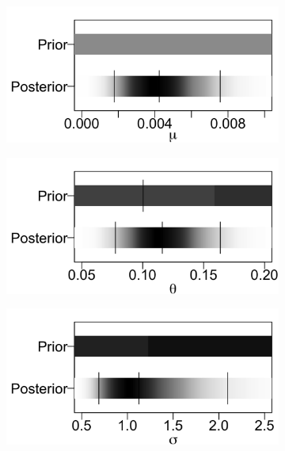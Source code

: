 \documentclass{uwstat572}
\begin{document}
\begin{figure}[H]
	\centering
	\begin{subfigure}[b]{0.3\textwidth}
		\includegraphics[width=\textwidth]{figures/figure_2a.png}
		\caption{}
		\label{fig:mu_density}
	\end{subfigure}
	\hfill
	\begin{subfigure}[b]{0.3\textwidth}
		\includegraphics[width=\textwidth]{figures/figure_2b.png}
		\caption{}
		\label{fig:theta_density}
	\end{subfigure}
	\hfill
	\begin{subfigure}[b]{0.3\textwidth}
		\includegraphics[width=\textwidth]{figures/figure_2c.png}

\end{subfigure}
\end{figure}
\end{document}

